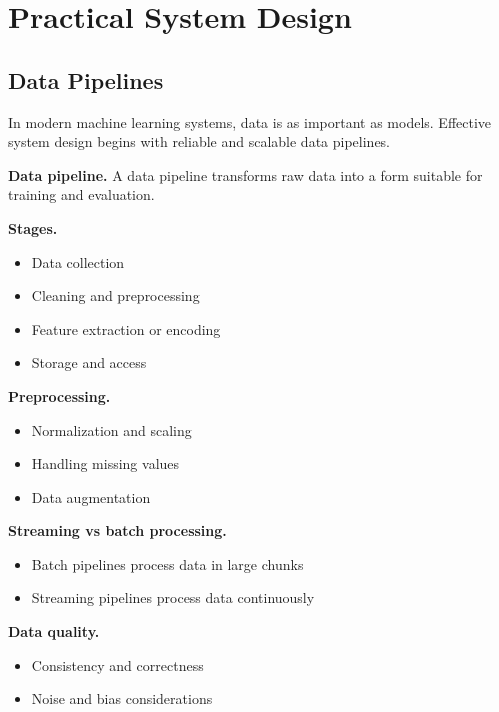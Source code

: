 \chapter{Practical System Design}

\section{Data Pipelines}

In modern machine learning systems, data is as important as models. Effective system design begins with reliable and scalable data pipelines.

\medskip

\noindent
\textbf{Data pipeline.}  
A data pipeline transforms raw data into a form suitable for training and evaluation.

\medskip

\noindent
\textbf{Stages.}
\begin{itemize}
    \item Data collection
    \item Cleaning and preprocessing
    \item Feature extraction or encoding
    \item Storage and access
\end{itemize}

\medskip

\noindent
\textbf{Preprocessing.}
\begin{itemize}
    \item Normalization and scaling
    \item Handling missing values
    \item Data augmentation
\end{itemize}

\medskip

\noindent
\textbf{Streaming vs batch processing.}
\begin{itemize}
    \item Batch pipelines process data in large chunks
    \item Streaming pipelines process data continuously
\end{itemize}

\medskip

\noindent
\textbf{Data quality.}
\begin{itemize}
    \item Consistency and correctness
    \item Noise and bias considerations
\end{itemize}

